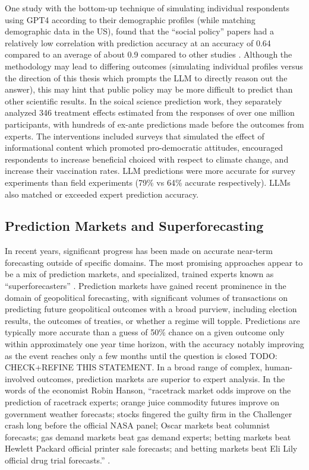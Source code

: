 \documentclass[12pt,a4paper]{article}
\begin{document}
One study with the bottom-up technique of simulating individual respondents using GPT4 according to their demographic profiles (while matching demographic data in the US), found that the ``social policy'' papers had a relatively low correlation with prediction accuracy at an accuracy of 0.64 compared to an average of about 0.9 compared to other studies . Although the methodology may lead to differing outcomes (simulating individual profiles versus the direction of this thesis which prompts the LLM to directly reason out the answer), this may hint that public policy may be more difficult to predict than other scientific results. In the soical science prediction work, they separately analyzed 346 treatment effects estimated from the responses of over one million participants, with hundreds of ex-ante predictions made before the outcomes from experts. The interventions included surveys that simulated the effect of informational content which promoted pro-democratic attitudes, encouraged respondents to increase beneficial choiced with respect to climate change, and increase their vaccination rates. LLM predictions were more accurate for survey experiments than field experiments (79\% vs 64\% accurate respectively). LLMs also matched or exceeded expert prediction accuracy.

\subsection{Prediction Markets and Superforecasting}
In recent years, significant progress has been made on accurate near-term forecasting outside of specific domains. The most promising approaches appear to be a mix of prediction markets, and specialized, trained experts known as ``superforecasters'' . Prediction markets have gained recent prominence in the domain of geopolitical forecasting, with significant volumes of transactions on predicting future geopolitical outcomes with a broad purview, including election results, the outcomes of treaties, or whether a regime will topple. Predictions are typically more accurate than a guess of 50\% chance on a given outcome only within approximately one year time horizon, with the accuracy notably improving as the event reaches only a few months until the question is closed  TODO: CHECK+REFINE THIS STATEMENT.  In a broad range of complex, human-involved outcomes, prediction markets are superior to expert analysis. In the words of the economist Robin Hanson, ``racetrack market odds improve on the prediction of racetrack  experts; orange juice commodity futures improve on government weather forecasts;  stocks fingered the guilty firm in the Challenger crash long before the official NASA  panel; Oscar markets beat columnist forecasts; gas demand markets beat gas  demand experts; betting markets beat Hewlett Packard official printer sale  forecasts; and betting markets beat Eli Lily official drug trial forecasts.''  . 
\end{document}
